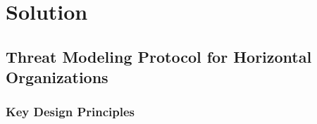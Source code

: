 
%

\chapter{Solution}
\label{cha:solution}


\glsresetall
 
\section{Threat Modeling Protocol for Horizontal Organizations}
\label{sec:protocol}


\subsection{Key Design Principles}
\label{subsec:key_principles}

